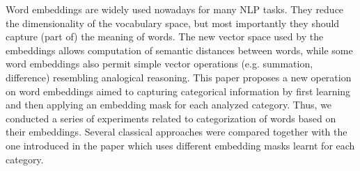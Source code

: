 Word embeddings are widely used nowadays for many NLP tasks. They reduce the dimensionality of the vocabulary space, but most importantly they should capture (part of) the meaning of words. The new vector space used by the embeddings allows computation of semantic distances between words, while some word embeddings also permit simple vector operations (e.g. summation, difference) resembling analogical reasoning. This paper proposes a new operation on word embeddings aimed to capturing categorical information by first learning and then applying an embedding mask for each analyzed category. Thus, we conducted a series of experiments related to categorization of words based on their embeddings. Several classical approaches were compared together with the one introduced in the paper which uses different embedding masks learnt for each category.
